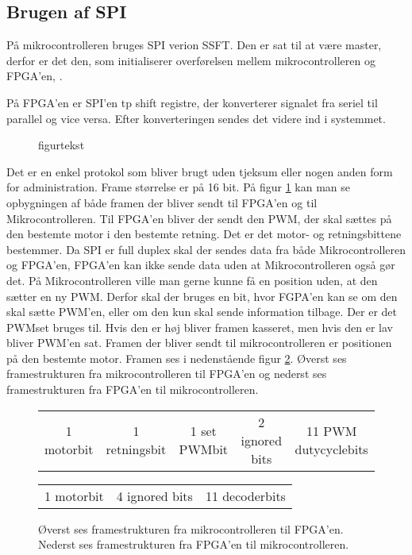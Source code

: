 \subsection{Brugen af SPI}




På mikrocontrolleren bruges SPI verion SSFT. Den er sat til at være master, derfor er det den, som initialiserer overførelsen mellem mikrocontrolleren og FPGA'en, \citep[Kap. 13]{lm3s6965}.

På FPGA'en er SPI'en tp shift registre, der konverterer signalet fra seriel til parallel og vice versa. Efter konverteringen sendes det videre ind i systemmet. 

\begin{figure}[!th]
\centering
\begin{tikzpicture}[scale=1]

\end{tikzpicture}
\caption[tekst i indholdsfortegnelsen]{figurtekst}
\label{fig:signal_SPI}
\end{figure}

Det er en enkel protokol som bliver brugt uden tjeksum eller nogen anden form for administration. Frame størrelse er på 16 bit. På figur \ref{fig:signal_SPI} kan man se opbygningen af både framen der bliver sendt til FPGA’en og til Mikrocontrolleren. Til FPGA’en bliver der sendt den PWM, der skal sættes på den bestemte motor i den bestemte retning. Det er det motor- og retningsbittene bestemmer. Da SPI er full duplex skal der sendes data fra både Mikrocontrolleren og FPGA’en, FPGA’en kan ikke sende data uden at Mikrocontrolleren også gør det. På Mikrocontrolleren ville man gerne kunne få en position uden, at den sætter en ny PWM. Derfor skal der bruges en bit, hvor FGPA’en kan se om den skal sætte PWM’en, eller om den kun skal sende information tilbage. Der er det PWMset bruges til. Hvis den er høj bliver framen kasseret, men hvis den er lav bliver PWM’en sat. Framen der bliver sendt til mikrocontrolleren er positionen på den bestemte motor. Framen ses i nedenstående figur \ref{tb:protokol1}. Øverst ses framestrukturen fra mikrocontrolleren til FPGA'en og nederst ses framestrukturen fra FPGA'en til mikrocontrolleren. 

\begin{figure}[th!]
\centering
\begin{tabular}{c|c|c|c|c}
1 motorbit &1 retningsbit & 1 set PWMbit & 2 ignored bits & 11 PWM dutycyclebits\\
\end{tabular}
 \begin{tabular}{c|c|c}
 1 motorbit & 4 ignored bits & 11 decoderbits
 \end{tabular}
\captionsetup{type=figure}
\caption[SPI framestruktur]{Øverst ses framestrukturen fra mikrocontrolleren til FPGA'en. Nederst ses framestrukturen fra FPGA'en til mikrocontrolleren.}
\label{tb:protokol1}
\end{figure}

